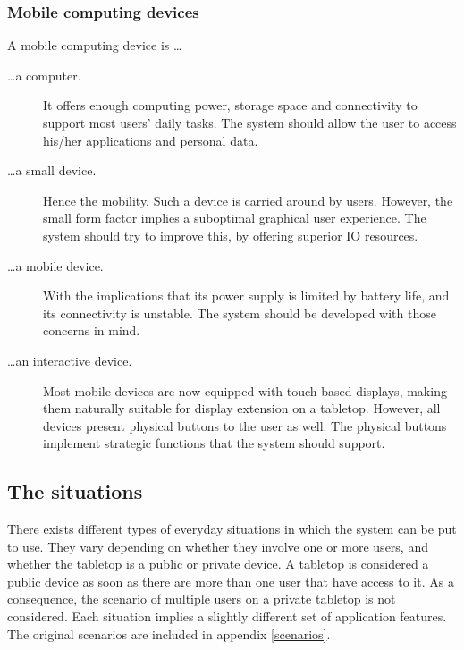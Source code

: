 \subsubsection{Mobile computing devices}

A mobile computing device is \ldots

\begin{description}

\item[\ldots a computer.] It offers enough computing power, storage space and connectivity to support most users' daily tasks. The system should allow the user to access his/her applications and personal data.

\item[\ldots a small device.] Hence the mobility. Such a device is carried around by users. However, the small form factor implies a suboptimal graphical user experience.
The system should try to improve this, by offering superior IO resources.

\item[\ldots a mobile device.] With the implications that its power supply is limited by battery life, and its connectivity is unstable. The system should be developed with those concerns in mind.

\item[\ldots an interactive device.] Most mobile devices are now equipped with touch-based displays, making them naturally suitable for display extension on a tabletop.
However, all devices present physical buttons to the user as well.
The physical buttons implement strategic functions that the system should support.

\end{description}

\subsection{The situations}
\label{sec:scenarios}

There exists different types of everyday situations in which the system can be put to use.
They vary depending on whether they involve one or more users, and whether the tabletop is a public or private device.
A tabletop is considered a public device as soon as there are more than one user that have access to it.
As a consequence, the scenario of multiple users on a private tabletop is not considered.
Each situation implies a slightly different set of application features.
The original scenarios are included in appendix \ref{scenarios}.


